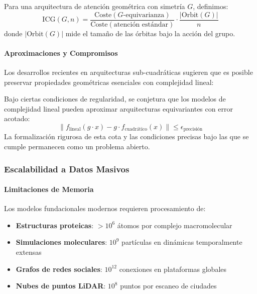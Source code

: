 \begin{definition}
Para una arquitectura de atención geométrica con simetría $G$, definimos:
\begin{equation}
\text{ICG}(G, n) = \frac{\text{Coste}(G\text{-equivarianza})}{\text{Coste}(\text{atención estándar})} \cdot \frac{|\text{Orbit}(G)|}{n}
\label{eq:geometric_complexity_index}
\end{equation}
donde $|\text{Orbit}(G)|$ mide el tamaño de las órbitas bajo la acción del grupo.
\end{definition}

\paragraph{Aproximaciones y Compromisos}

Los desarrollos recientes en arquitecturas sub-cuadráticas sugieren que es posible preservar propiedades geométricas esenciales con complejidad lineal:

\begin{remark}
Bajo ciertas condiciones de regularidad, se conjetura que los modelos de complejidad lineal pueden aproximar arquitecturas equivariantes con error acotado:
\begin{equation}
\|f_{\text{lineal}}(g \cdot x) - g \cdot f_{\text{cuadr\'atico}}(x)\| \leq \epsilon_{\text{precisi\'on}}
\label{eq:linear_equivariance_approximation}
\end{equation}
La formalización rigurosa de esta cota y las condiciones precisas bajo las que se cumple permanecen como un problema abierto.
\end{remark}

\subsubsection{Escalabilidad a Datos Masivos}

\paragraph{Limitaciones de Memoria}

Los modelos fundacionales modernos requieren procesamiento de:
\begin{itemize}
    \item \textbf{Estructuras proteicas}: $>10^6$ átomos por complejo macromolecular
    \item \textbf{Simulaciones moleculares}: $10^9$ partículas en dinámicas temporalmente extensas
    \item \textbf{Grafos de redes sociales}: $10^{12}$ conexiones en plataformas globales
    \item \textbf{Nubes de puntos LiDAR}: $10^8$ puntos por escaneo de ciudades
\end{itemize}

